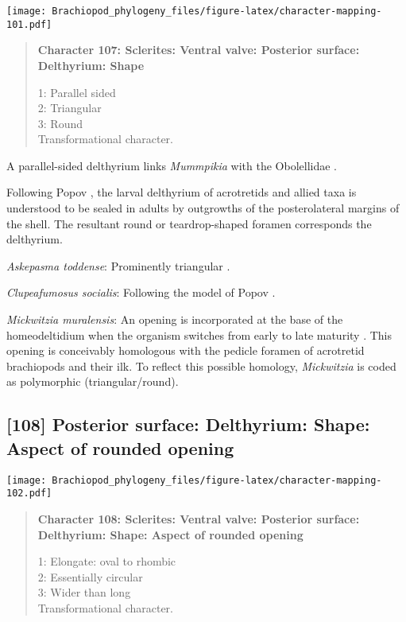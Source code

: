 \documentclass[openany]{book}
\theoremstyle{definition}
\theoremstyle{definition}
\theoremstyle{definition}
\theoremstyle{remark}
\begin{document}
\texttt{[image: Brachiopod\_phylogeny\_files/figure-latex/character-mapping-101.pdf]}

\begin{quote}
\textbf{Character 107: Sclerites: Ventral valve: Posterior surface:
Delthyrium: Shape}

1: Parallel sided\\
2: Triangular\\
3: Round\\
Transformational character.
\end{quote}

A parallel-sided delthyrium links \emph{Mummpikia} with the Obolellidae
\citep{Balthasar2008iMummpikia}.

Following Popov \citeyearpar{Popov1992TheCambrian}, the larval
delthyrium of acrotretids and allied taxa is understood to be sealed in
adults by outgrowths of the posterolateral margins of the shell. The
resultant round or teardrop-shaped foramen corresponds the delthyrium.

\hypertarget{Askepasma_toddense-coding-107}{}
\emph{Askepasma toddense}: Prominently triangular \citep[see][fig.
2]{Topper2013Theoldest}.

\hypertarget{Clupeafumosus_socialis-coding-107}{}
\emph{Clupeafumosus socialis}: Following the model of Popov
\citeyearpar{Popov1992TheCambrian}.

\hypertarget{Mickwitzia_muralensis-coding-107}{}
\emph{Mickwitzia muralensis}: An opening is incorporated at the base of
the homeodeltidium when the organism switches from early to late
maturity \citep[fig. 10 in][]{Balthasar2004Shellstructure}. This opening
is conceivably homologous with the pedicle foramen of acrotretid
brachiopods and their ilk. To reflect this possible homology,
\emph{Mickwitzia} is coded as polymorphic (triangular/round).

\subsection*{{[}108{]} Posterior surface: Delthyrium: Shape: Aspect of
rounded
opening}\label{posterior-surface-delthyrium-shape-aspect-of-rounded-opening}

\texttt{[image: Brachiopod\_phylogeny\_files/figure-latex/character-mapping-102.pdf]}

\begin{quote}
\textbf{Character 108: Sclerites: Ventral valve: Posterior surface:
Delthyrium: Shape: Aspect of rounded opening}

1: Elongate: oval to rhombic\\
2: Essentially circular\\
3: Wider than long\\
Transformational character.
\end{quote}
\end{document}
